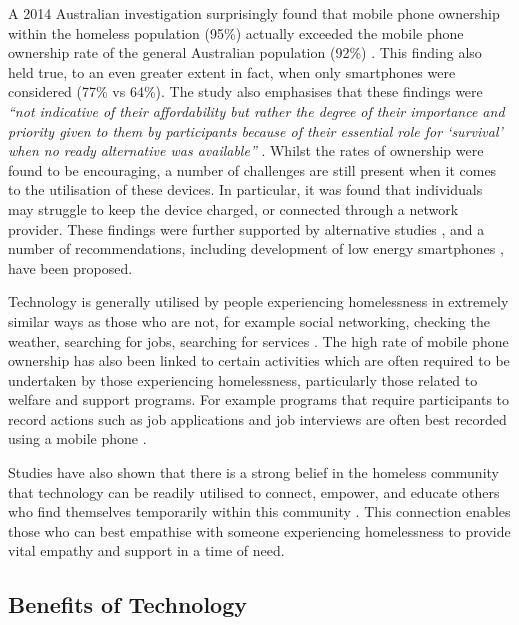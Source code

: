 A 2014 Australian investigation surprisingly found that mobile phone ownership within the homeless population (95\%) actually exceeded the mobile phone ownership rate of the general Australian population (92\%) \cite{humphry2014importance}. This finding also held true, to an even greater extent in fact, when only smartphones were considered (77\% vs 64\%). The study also emphasises that these findings were \emph{“not indicative of their affordability but rather the degree of their importance and priority given to them by participants because of their essential role for ‘survival’ when no ready alternative was available”} \cite[p.~55.7]{humphry2014importance}. Whilst the rates of ownership were found to be encouraging, a number of challenges are still present when it comes to the utilisation of these devices. In particular, it was found that individuals may struggle to keep the device charged, or connected through a network provider. These findings were further supported by alternative studies \cite{raven2018mobile} \cite{woelfer2011artifacts}, and a number of recommendations, including development of low energy smartphones \cite{kinzer2014low}, have been proposed.

Technology is generally utilised by people experiencing homelessness in extremely similar ways as those who are not, for example social networking, checking the weather, searching for jobs, searching for services \cite{rhoades2017no} \cite{eyrich2011sheltered} \cite{woelfer2010homeless}. The high rate of mobile phone ownership has also been linked to certain activities which are often required to be undertaken by those experiencing homelessness, particularly those related to welfare and support programs. For example programs that require participants to record actions such as job applications and job interviews are often best recorded using a mobile phone \cite{humphry2014importance}.

Studies have also shown that there is a strong belief in the homeless community that technology can be readily utilised to connect, empower, and educate others who find themselves temporarily within this community \cite{eyrich2011sheltered}. This connection enables those who can best empathise with someone experiencing homelessness to provide vital empathy and support in a time of need.

\subsection{Benefits of Technology}

